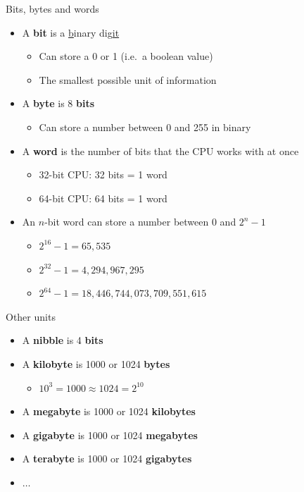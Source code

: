 \begin{frame}{Bits, bytes and words}
	\begin{itemize}
		\pause\item A \textbf{bit} is a \uline{b}inary dig\uline{it}
			\begin{itemize}
				\pause\item Can store a 0 or 1 (i.e.\ a boolean value)
				\pause\item The smallest possible unit of information
			\end{itemize}
		\pause\item A \textbf{byte} is 8 \textbf{bits}
			\begin{itemize}
				\pause\item Can store a number between 0 and 255 in binary
			\end{itemize}
		\pause\item A \textbf{word} is the number of bits that the CPU works with at once
			\begin{itemize}
				\pause\item 32-bit CPU: 32 bits = 1 word
				\pause\item 64-bit CPU: 64 bits = 1 word
			\end{itemize}
		\pause\item An $n$-bit word can store a number between 0 and $2^{n} - 1$
			\begin{itemize}
				\pause\item $2^{16}-1 = 65,535$
				\pause\item $2^{32}-1 = 4,294,967,295$
				\pause\item $2^{64}-1 = 18,446,744,073,709,551,615$
			\end{itemize}
	\end{itemize}
\end{frame}

\begin{frame}{Other units}
    \begin{itemize}
        \pause\item A \textbf{nibble} is 4 \textbf{bits}
        \pause\item A \textbf{kilobyte} is 1000 or 1024 \textbf{bytes}
            \begin{itemize}
                \pause\item $10^3 = 1000 \approx 1024 = 2^{10}$
            \end{itemize}
        \pause\item A \textbf{megabyte} is 1000 or 1024 \textbf{kilobytes}
        \pause\item A \textbf{gigabyte} is 1000 or 1024 \textbf{megabytes}
        \pause\item A \textbf{terabyte} is 1000 or 1024 \textbf{gigabytes}
        \pause\item $\dots$
    \end{itemize}
\end{frame}

